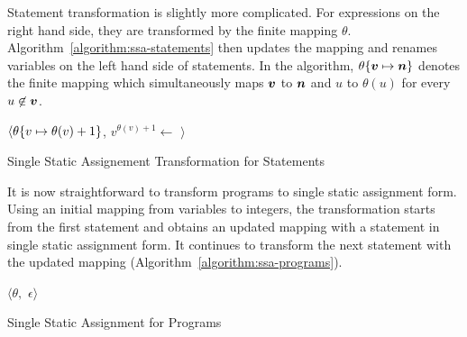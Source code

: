 Statement transformation is slightly more complicated. For
expressions on the right hand side, they are transformed by the finite
mapping $\theta$. Algorithm~\ref{algorithm:ssa-statements} then
updates the mapping and renames variables on the left hand side of
statements. In the algorithm, $\theta\mymapsto{\vv}{\vn}$
denotes the finite mapping which simultaneously maps $\vv$ to
$\vn$ and $u$ to $\theta(u)$ for every $u \not\in \vv$.

\begin{algorithm}[ht]
  \begin{algorithmic}[1]
        \Return $\langle \theta\{{v} \mapsto {\theta(v) + 1}\}$, 
                $v^{\theta(v) + 1} \leftarrow$ $\rangle$
      \EndCase
      \EndCase
    \EndMatch
    \EndFunction
  \end{algorithmic}
  \caption{Single Static Assignement Transformation for Statements}
  \label{algorithm:ssa-statements}
\end{algorithm}

It is now straightforward to transform programs to single static
assignment form. Using an initial mapping from variables to integers,
the transformation starts from the first statement and obtains an
updated mapping with a statement in single static assignment form. It
continues to transform the next statement with the updated mapping
(Algorithm~\ref{algorithm:ssa-programs}). 

\begin{algorithm}[ht]
  \begin{algorithmic}[1]
      \Case{$\epsilon$}
        \Return $\langle \theta,$ $\epsilon \rangle$
      \EndCase
      \EndCase
    \EndMatch
    \EndFunction
  \end{algorithmic}
  \caption{Single Static Assignment for Programs}
  \label{algorithm:ssa-programs}
\end{algorithm}

